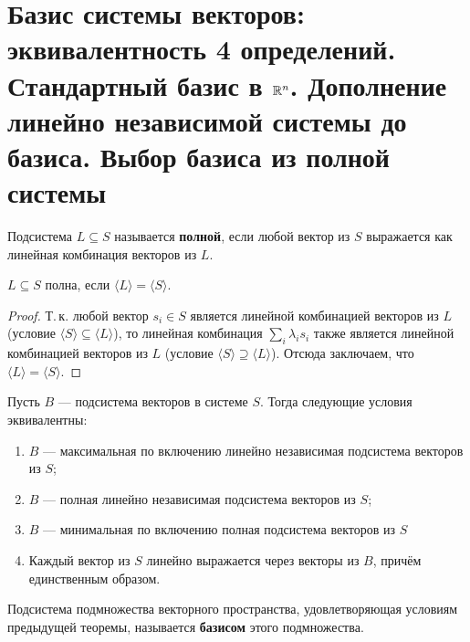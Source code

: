 \section{Базис системы векторов: эквивалентность 4 определений. Стандартный базис в $\mathbb{R}^n$. Дополнение линейно независимой системы до базиса. Выбор базиса из полной системы}

\begin{definition}
    Подсистема $L \subseteq S$ называется \textbf{полной}, если любой вектор из $S$ выражается как линейная комбинация векторов из $L$.
\end{definition}

\begin{statement}
    $L \subseteq S$ полна, если $\langle L\rangle = \langle S\rangle$.
\end{statement}

\begin{proof}
    Т.\,к. любой вектор $s_i \in S$ является линейной комбинацией векторов из $L$ (условие $\langle S\rangle \subseteq \langle L\rangle$), то линейная комбинация $\sum_i \lambda_is_i$ также является линейной комбинацией векторов из $L$ (условие $\langle S\rangle \supseteq \langle L\rangle$). Отсюда заключаем, что $\langle L\rangle = \langle S\rangle$.
\end{proof}

\begin{theorem}
    Пусть $B$ --- подсистема векторов в системе $S$. Тогда следующие условия эквивалентны:
    \begin{enumerate}[nolistsep]
        \item $B$ --- максимальная по включению линейно независимая подсистема векторов из $S$;
        \item $B$ --- полная линейно независимая подсистема векторов из $S$;
        \item $B$ --- минимальная по включению полная подсистема векторов из $S$
        \item Каждый вектор из $S$ линейно выражается через векторы из $B$, причём единственным образом.
    \end{enumerate}
\end{theorem}

\begin{definition}
    Подсистема подмножества векторного пространства, удовлетворяющая условиям предыдущей теоремы, называется \textbf{базисом} этого подмножества.
\end{definition}

